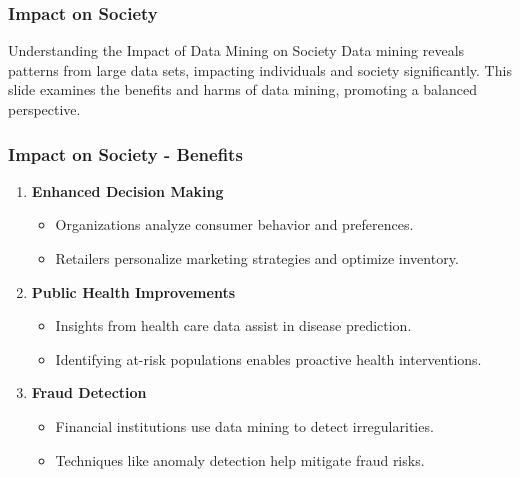 \documentclass{beamer}
\begin{document}
\begin{frame}[fragile]
    \frametitle{Impact on Society}
    \begin{block}{Understanding the Impact of Data Mining on Society}
        Data mining reveals patterns from large data sets, impacting individuals and society significantly. This slide examines the benefits and harms of data mining, promoting a balanced perspective.
    \end{block}
\end{frame}

\begin{frame}[fragile]
    \frametitle{Impact on Society - Benefits}
    \begin{enumerate}
        \item \textbf{Enhanced Decision Making}
            \begin{itemize}
                \item Organizations analyze consumer behavior and preferences.
                \item Retailers personalize marketing strategies and optimize inventory.
            \end{itemize}
        
        \item \textbf{Public Health Improvements}
            \begin{itemize}
                \item Insights from health care data assist in disease prediction.
                \item Identifying at-risk populations enables proactive health interventions.
            \end{itemize}
        
        \item \textbf{Fraud Detection}
            \begin{itemize}
                \item Financial institutions use data mining to detect irregularities.
                \item Techniques like anomaly detection help mitigate fraud risks.
            \end{itemize}
    \end{enumerate}
\end{frame}
\end{document}
